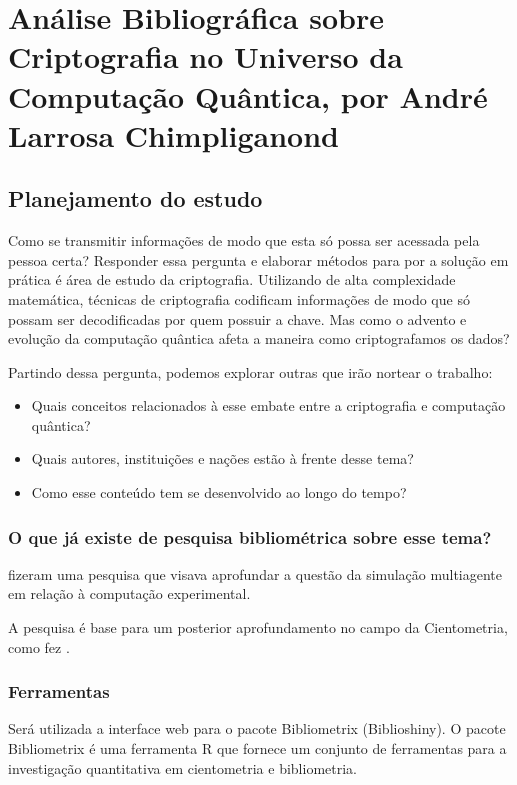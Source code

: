 \chapter{Análise Bibliográfica sobre Criptografia no Universo da Computação Quântica, por André Larrosa Chimpliganond}

\section{Planejamento do estudo}
Como se transmitir informações de modo que esta só possa ser acessada pela pessoa certa? Responder essa pergunta e elaborar métodos para por a solução em prática é área de estudo da criptografia. Utilizando de alta complexidade matemática, técnicas de criptografia codificam informações de modo que só possam ser decodificadas por quem possuir a chave. Mas como o advento e evolução da computação quântica afeta a maneira como criptografamos os dados?

Partindo dessa pergunta, podemos explorar outras que irão nortear o trabalho:
\begin{itemize}
    \item Quais conceitos relacionados à esse embate entre a criptografia e computação quântica?
    \item Quais autores, instituições e nações estão à frente desse tema?
    \item Como esse conteúdo tem se desenvolvido ao longo do tempo?
\end{itemize}



\subsection{O que já existe de pesquisa bibliométrica sobre esse tema?}

\cite{gore_classifying_2016} fizeram uma pesquisa que visava aprofundar a questão da simulação multiagente em relação à computação experimental.

A pesquisa é base para um posterior aprofundamento no campo da Cientometria, como fez \cite{chavalarias_whats_2017}.
% 

\subsection{Ferramentas}
Será utilizada a interface web para o pacote Bibliometrix (Biblioshiny). O pacote Bibliometrix é uma ferramenta R que fornece um conjunto de ferramentas para a investigação quantitativa em cientometria e bibliometria.


